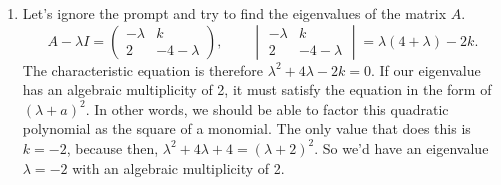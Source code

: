 \begin{enumerate}
	\item[\textbf{Q11}] Let's ignore the prompt and try to find the eigenvalues of the matrix \(A\). 
		\[A - \lambda I = \begin{pmatrix}-\lambda & k \\ 2  & -4 - \lambda\end{pmatrix}, 
		\qquad \begin{vmatrix}-\lambda & k \\ 2  & -4 - \lambda\end{vmatrix} = \lambda(4+\lambda) - 2k.\]
		The characteristic equation is therefore \(\lambda^2 + 4\lambda - 2k = 0\). If our eigenvalue has an algebraic multiplicity of 2, it must satisfy the
		equation in the form of \((\lambda + a)^2\). In other words, we should be able to factor this quadratic polynomial as the square of a monomial.
		The only value that does this is \(k = -2\), because then, \(\lambda^2 + 4\lambda + 4 = (\lambda + 2)^2\). So we'd have an eigenvalue 
		\(\lambda = -2\) with an algebraic multiplicity of 2.


\end{enumerate}
